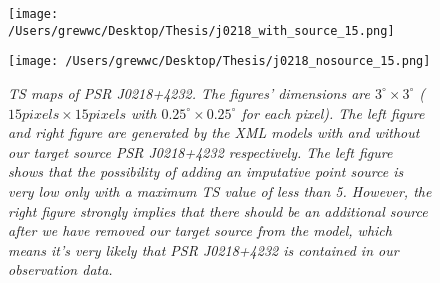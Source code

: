 \documentclass[12pt]{report}
\newcommand{\mycaption}[1]{\caption{\textit{\footnotesize #1}}}
\begin{document}
            \begin{figure}[!ht]
              \begin{center}
              \begin{minipage}{0.46\textwidth}
                \begin{center} 
                  \texttt{[image: /Users/grewwc/Desktop/Thesis/j0218\_with\_source\_15.png]}
                \end{center}
              \end{minipage}
              \begin{minipage}{0.45\textwidth}
                \begin{center}
                  \texttt{[image: /Users/grewwc/Desktop/Thesis/j0218\_nosource\_15.png]}
                \end{center}
              \end{minipage}
            \end{center}

              \centering
              \begin{minipage}{\textwidth}
                \mycaption{TS maps of PSR J0218+4232. The figures' dimensions are $3^{\circ} \times3^{\circ}$ ($15 pixels \times 
                15 pixels$ with $0.25^{\circ} \times 0.25^{\circ}$ for each pixel). The \textsf{left}
                figure and \textsf{right} figure are generated by the XML models with and without our 
                target source PSR J0218+4232 respectively. The left figure shows that the possibility 
                of adding an imputative point source is very low only with a maximum TS value of 
                less than 5. However, the right figure strongly implies that there should be an additional 
                source after we have removed our target source from the model, which means it's very
                likely that PSR J0218+4232 is contained in our observation data.}
                \label{fig: j0218_tsmap_comparison_15}
              \end{minipage}
            \end{figure}
\end{document}
